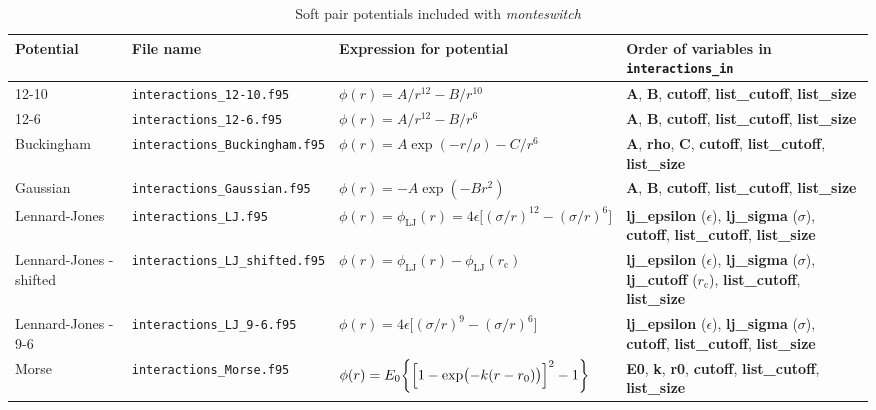 \documentclass{report}
\begin{document}
\begin{landscape}
\begin{center}\label{table:pair_potentials}
\begin{longtable}{ l l l p{5cm} }
\caption{Soft pair potentials included with \emph{monteswitch}}
\\
Potential & File name & Expression for potential & Order of variables in \texttt{interactions\_in}  \\

\hline

12-10 & \texttt{interactions\_12-10.f95} & $\phi(r)=A/r^{12}-B/r^{10}$ 
& \textbf{A}, \textbf{B}, \textbf{cutoff}, \textbf{list\_cutoff}, \textbf{list\_size} \\

12-6  &  \texttt{interactions\_12-6.f95} & $\phi(r)=A/r^{12}-B/r^{6}$ 
& \textbf{A}, \textbf{B}, \textbf{cutoff}, \textbf{list\_cutoff}, \textbf{list\_size} \\

Buckingham & \texttt{interactions\_Buckingham.f95} & $\phi(r)=A\exp(-r/\rho)-C/r^6$ 
& \textbf{A}, \textbf{rho}, \textbf{C}, \textbf{cutoff}, \textbf{list\_cutoff}, \textbf{list\_size} \\

Gaussian & \texttt{interactions\_Gaussian.f95} & $\phi(r)=-A\exp(-Br^2)$ 
& \textbf{A}, \textbf{B}, \textbf{cutoff}, \textbf{list\_cutoff}, \textbf{list\_size} \\

Lennard-Jones & \texttt{interactions\_LJ.f95} & $\phi(r)=\phi_{\text{LJ}}(r)=4\epsilon\bigl[(\sigma/r)^{12}-(\sigma/r)^6\bigr]$
& \textbf{lj\_epsilon} ($\epsilon$), \textbf{lj\_sigma} ($\sigma$), \textbf{cutoff}, \textbf{list\_cutoff}, \textbf{list\_size} \\

Lennard-Jones - shifted  & \texttt{interactions\_LJ\_shifted.f95} & $\phi(r)=\phi_{\text{LJ}}(r)-\phi_{\text{LJ}}(r_{\text{c}})$ 
& \textbf{lj\_epsilon} ($\epsilon$), \textbf{lj\_sigma} ($\sigma$), \textbf{lj\_cutoff} ($r_{\text{c}}$), \textbf{list\_cutoff}, \textbf{list\_size} \\

Lennard-Jones - 9-6 & \texttt{interactions\_LJ\_9-6.f95} & $\phi(r)=4\epsilon\bigl[(\sigma/r)^9-(\sigma/r)^6\bigr]$
& \textbf{lj\_epsilon} ($\epsilon$), \textbf{lj\_sigma} ($\sigma$), \textbf{cutoff}, \textbf{list\_cutoff}, \textbf{list\_size} \\

Morse & \texttt{interactions\_Morse.f95} & $\phi(r)=E_0\bigg\lbrace \Bigl[1-\exp\bigl(-k(r-r_0)\bigr)\Bigr]^2 -1 \biggr\rbrace$ 
& \textbf{E0}, \textbf{k}, \textbf{r0}, \textbf{cutoff}, \textbf{list\_cutoff}, \textbf{list\_size} \\


\end{longtable}
\end{center}
\end{landscape}
\end{document}
